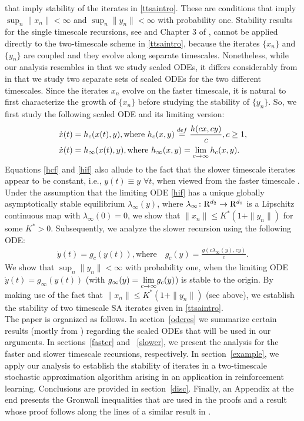 that imply stability of the iterates in \eqref{ttsaintro}. These are conditions that imply 
$\sup_n\parallel x_n\parallel <\infty$ and $\sup_n\parallel y_n\parallel
<\infty$ with probability one. Stability results 
for the single timescale recursions, see \cite{BMSTAB} and Chapter $3$ of \cite{SA}, cannot be applied 
directly to the two-timescale scheme in \eqref{ttsaintro}, because the iterates $\{x_n\}$ and $\{y_n\}$ 
are coupled and they evolve along separate timescales. Nonetheless, while our analysis resembles 
\cite{SA,TTSAP} 
in that we study scaled ODEs, it differs considerably from \cite{SA} in that we study two separate 
sets of scaled ODEs for the two different timescales. Since the iterates $x_n$ evolve on the faster 
timescale, it is natural to first characterize the growth of $\{x_n\}$ before studying the stability
of $\{y_n\}$. So, we first study the following scaled ODE and its limiting version:
\begin{align}
\label{hcf} \dot{x}(t)&={h}_c(x(t),y), \text{where}\mbox{ } {h}_c(x,y)\stackrel{def}{=}\frac{h(cx,cy)}{c}, 
c \geq 1,\\
\label{hif} \dot{x}(t)&=h_\infty(x(t),y), \text{where}\mbox{ } {h}_\infty(x,y)=\lim_{c \rightarrow \infty}h_c(x,y).
\end{align}
Equations \eqref{hcf} and \eqref{hif} also allude to the fact that the slower timescale iterates 
appear to be constant, i.e., $y(t)\equiv y$ $\forall t$, when viewed from the faster timescale 
\cite{SA}.\\
Under the assumption that the limiting ODE \eqref{hif} has a unique globally asymptotically stable 
equilibrium $\lambda_\infty(y)$, where $\lambda_\infty \colon \mathrm{R}^{d_2} \rightarrow \mathrm{R}^{d_1}$
is a Lipschitz continuous map with $\lambda_\infty(0)=0$, we show that $\parallel x_n\parallel
\leq K^*(1+\parallel y_n\parallel)$ 
for some $K^*>0$. Subsequently, we analyze the slower recursion using the following ODE:
\begin{align}\label{gc} 
\dot{y}(t)=g_c(y(t)), \text{where } \mbox{ } g_c(y)=\frac{g(c\lambda_\infty(y),cy)}{c}.
\end{align}
We show that $\sup_n \parallel y_n\parallel <\infty$ with probability one, when the limiting 
ODE $\dot{y}(t)=g_\infty(y(t))$ (with $g_\infty(y)=\underset{c\rightarrow\infty}{\lim}g_c(y)$) is stable 
to the origin. By making use of the fact that $\parallel x_n\parallel \leq K^*(1+\parallel y_n\parallel)$ 
(see above), 
we establish the stability of two timescale SA iterates given in \eqref{ttsaintro}.\\
\indent The paper is organized as follows. In section~\ref{oderes} we summarize certain results 
(mostly from \cite{SA,TTSAP}) regarding the scaled ODEs that will be used in our arguments. 
In sections~\ref{faster} and ~\ref{slower}, we present the analysis for the faster and slower 
timescale recursions, respectively. In section~\ref{example}, we apply our analysis to establish 
the stability of iterates in a two-timescale stochastic approximation algorithm arising in an 
application in reinforcement learning. Conclusions are provided in section~\ref{disc}. 
Finally, an Appendix at the end presents the Gronwall inequalities that are used in the proofs 
and a result whose proof follows along the lines of a similar result in \cite{SA}.

